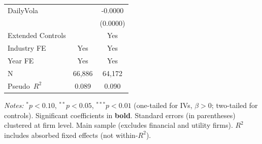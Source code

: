 \documentclass[11pt,a4paper]{article}
\begin{document}
\begin{table}[htbp]
\begin{tabular}{lcc}
DailyVola &  & -0.0000 \\
 &  & (0.0000) \\
\midrule
Extended Controls &  & Yes \\
Industry FE & Yes & Yes \\
Year FE & Yes & Yes \\
\midrule
N & 66,886 & 64,172 \\
Pseudo~$R^2$ & 0.089 & 0.090 \\
\bottomrule
\end{tabular}
\begin{minipage}{\linewidth}
\vspace{2pt}\scriptsize
\textit{Notes:} $^{*}p<0.10$, $^{**}p<0.05$, $^{***}p<0.01$ (one-tailed for IVs, $\beta > 0$; two-tailed for controls).
 Significant coefficients in \textbf{bold}.
 Standard errors (in parentheses) clustered at firm level.
 Main sample (excludes financial and utility firms).
 $R^2$ includes absorbed fixed effects (not within-$R^2$).
\end{minipage}
\end{table}
\clearpage
\end{document}
